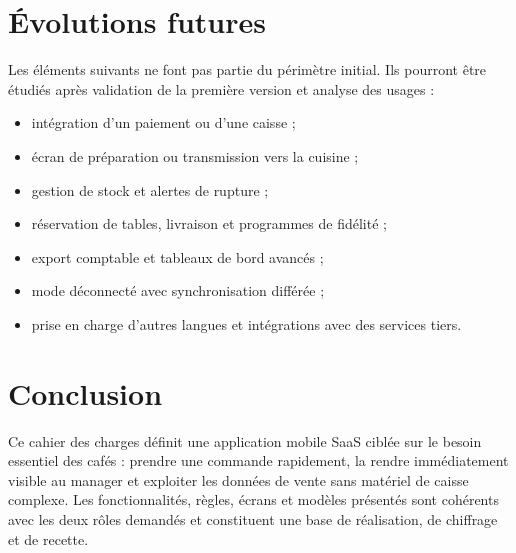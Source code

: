 \documentclass[11pt,a4paper]{article}
\begin{document}
\section{Évolutions futures}
Les éléments suivants ne font pas partie du périmètre initial. Ils pourront être étudiés après validation de la première version et analyse des usages :
\begin{itemize}
  \item intégration d’un paiement ou d’une caisse ;
  \item écran de préparation ou transmission vers la cuisine ;
  \item gestion de stock et alertes de rupture ;
  \item réservation de tables, livraison et programmes de fidélité ;
  \item export comptable et tableaux de bord avancés ;
  \item mode déconnecté avec synchronisation différée ;
  \item prise en charge d’autres langues et intégrations avec des services tiers.
\end{itemize}

\section{Conclusion}
Ce cahier des charges définit une application mobile SaaS ciblée sur le besoin essentiel des cafés : prendre une commande rapidement, la rendre immédiatement visible au manager et exploiter les données de vente sans matériel de caisse complexe. Les fonctionnalités, règles, écrans et modèles présentés sont cohérents avec les deux rôles demandés et constituent une base de réalisation, de chiffrage et de recette.

\vfill
\begin{center}
\tcbox[colback=lightbeige,colframe=dustyrose,arc=3mm,boxsep=4mm]{\sffamily\textcolor{coffee}{Fin du cahier des charges · Version 1.0}}
\end{center}
\end{document}

